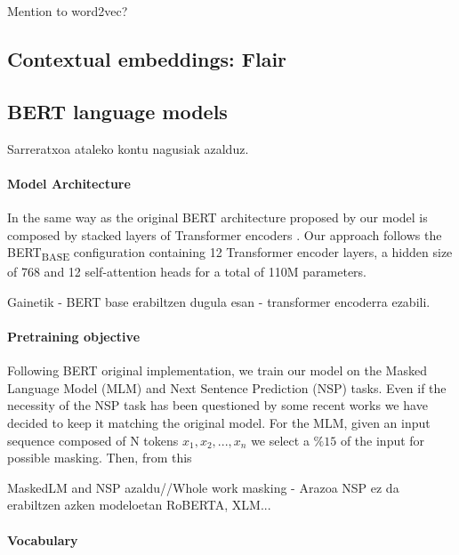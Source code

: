 \documentclass[10pt, a4paper]{article}
\begin{document}
Mention to word2vec?


\subsection{Contextual embeddings: Flair}
\label{sec:build-basq-models:flair}

\cite{akbik2018coling}


\subsection{BERT language models}
\label{sec:build-basq-models:bert}



Sarreratxoa ataleko kontu nagusiak azalduz. 

\paragraph{Model Architecture}

In the same way as the original BERT architecture proposed by  our model is composed by stacked layers of Transformer encoders \cite{vaswani2017attention}. Our approach follows the BERT\textsubscript{BASE} configuration containing 12 Transformer encoder layers, a hidden size of 768 and 12 self-attention heads for a total of 110M parameters. 

Gainetik - BERT base erabiltzen dugula esan - transformer encoderra ezabili.

\paragraph{Pretraining objective}

Following BERT original implementation, we train our model on the Masked Language Model (MLM) and Next Sentence Prediction (NSP) tasks. Even if the necessity of the NSP task has been questioned by some recent works \cite{yang2019xlnet,liu2019roberta,lample2019cross} we have decided to keep it matching the original model. For the MLM, given an input sequence composed of N tokens $x_1, x_2, ..., x_n$ we select a $\%15$ of the input for possible masking. Then, from this 

MaskedLM and NSP azaldu//Whole work masking - Arazoa NSP ez da erabiltzen azken modeloetan RoBERTA, XLM...


\paragraph{Vocabulary}
\end{document}
